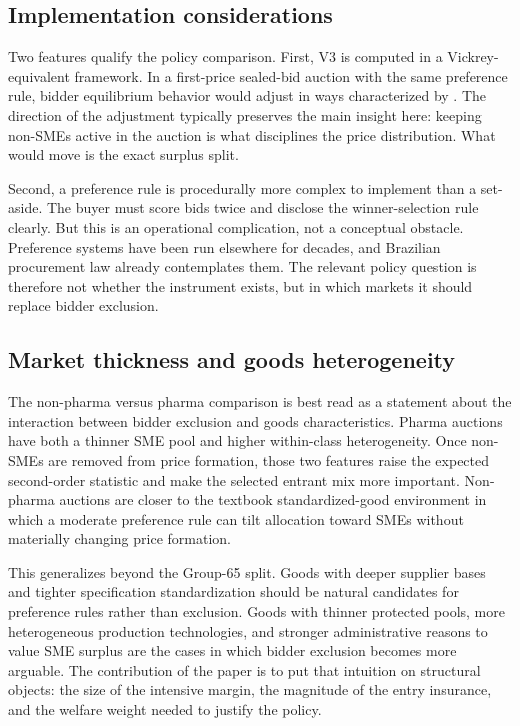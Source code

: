 \subsection{Implementation considerations}

Two features qualify the policy comparison. First, V3 is computed in a Vickrey-equivalent framework. In a first-price sealed-bid auction with the same preference rule, bidder equilibrium behavior would adjust in ways characterized by \citet{maskinriley2000}. The direction of the adjustment typically preserves the main insight here: keeping non-SMEs active in the auction is what disciplines the price distribution. What would move is the exact surplus split.

Second, a preference rule is procedurally more complex to implement than a set-aside. The buyer must score bids twice and disclose the winner-selection rule clearly. But this is an operational complication, not a conceptual obstacle. Preference systems have been run elsewhere for decades, and Brazilian procurement law already contemplates them. The relevant policy question is therefore not whether the instrument exists, but in which markets it should replace bidder exclusion.

\subsection{Market thickness and goods heterogeneity}

The non-pharma versus pharma comparison is best read as a statement about the interaction between bidder exclusion and goods characteristics. Pharma auctions have both a thinner SME pool and higher within-class heterogeneity. Once non-SMEs are removed from price formation, those two features raise the expected second-order statistic and make the selected entrant mix more important. Non-pharma auctions are closer to the textbook standardized-good environment in which a moderate preference rule can tilt allocation toward SMEs without materially changing price formation.

This generalizes beyond the Group-65 split. Goods with deeper supplier bases and tighter specification standardization should be natural candidates for preference rules rather than exclusion. Goods with thinner protected pools, more heterogeneous production technologies, and stronger administrative reasons to value SME surplus are the cases in which bidder exclusion becomes more arguable. The contribution of the paper is to put that intuition on structural objects: the size of the intensive margin, the magnitude of the entry insurance, and the welfare weight needed to justify the policy.

